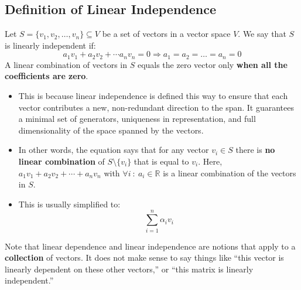 \documentclass[10pt]{article}
\begin{document}
\subsection*{Definition of Linear Independence}
Let $S = \{v_1, v_2, \dots, v_n\} \subseteq V$ be a set of vectors in a vector space $V$.  We say that $S$ is linearly independent if:
\[a_1 v_1 + a_2 v_2 + \cdots a_n v_n = 0 \Rightarrow a_1 = a_2 = \dots = a_n = 0\]
A linear combination of vectors in $S$ equals the zero vector only \textbf{when all the coefficients are zero}.
\begin{itemize}
	\item This is because linear independence is defined this way to ensure that each vector contributes a new, non-redundant direction to the span.  It guarantees a minimal set of generators, uniqueness in representation, and full dimensionality of the space spanned by the vectors.
	\item In other words, the equation says that for any vector $v_i \in S$ there is \textbf{no linear combination} of $S \setminus \{v_i\}$ that is equal to $v_i$.  Here, $a_1 v_1 + a_2 v_2 + \cdots + a_n v_n$ with $\forall i \::\: a_i \in \mathbb{R}$ is a linear combination of the vectors in $S$.
	\item This is usually simplified to:
	\[\sum_{i = 1}^n \alpha_i v_i\]
\end{itemize}
Note that linear dependence and linear independence are notions that apply to a \textbf{collection} of vectors.  It does not make sense to say things like ``this vector is linearly dependent on these other vectors,'' or ``this matrix is linearly independent.''
\end{document}
